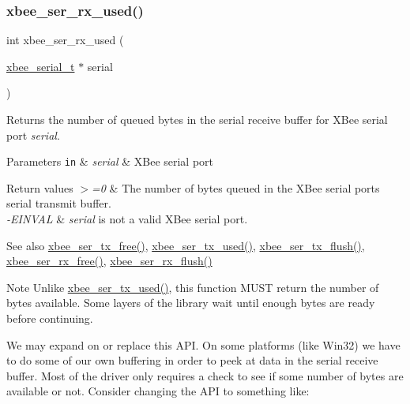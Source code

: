\subsubsection{\texorpdfstring{xbee\+\_\+ser\+\_\+rx\+\_\+used()}{xbee\_ser\_rx\_used()}}
{\footnotesize\ttfamily int xbee\+\_\+ser\+\_\+rx\+\_\+used (\begin{DoxyParamCaption}\item[{\hyperlink{structxbee__serial__t}{xbee\+\_\+serial\+\_\+t} $\ast$}]{serial }\end{DoxyParamCaption})}



Returns the number of queued bytes in the serial receive buffer for X\+Bee serial port {\itshape serial}. 


\begin{DoxyParams}[1]{Parameters}
\mbox{\tt in}  & {\em serial} & X\+Bee serial port\\
\hline
\end{DoxyParams}

\begin{DoxyRetVals}{Return values}
{\em $>$=0} & The number of bytes queued in the X\+Bee serial port\textquotesingle{}s serial transmit buffer. \\
\hline
{\em -\/\+E\+I\+N\+V\+AL} & {\itshape serial} is not a valid X\+Bee serial port.\\
\hline
\end{DoxyRetVals}
\begin{DoxySeeAlso}{See also}
\hyperlink{group__xbee__serial_ga3ad8f378b572d6fec982f1086bd3b94f}{xbee\+\_\+ser\+\_\+tx\+\_\+free()}, \hyperlink{group__xbee__serial_gaabf70934d186354cde4ac14ed27d1bd2}{xbee\+\_\+ser\+\_\+tx\+\_\+used()}, \hyperlink{group__xbee__serial_ga05308d37301d27715f1e1308b7189220}{xbee\+\_\+ser\+\_\+tx\+\_\+flush()}, \hyperlink{group__xbee__serial_ga16fb431a1e66861439518e562431821f}{xbee\+\_\+ser\+\_\+rx\+\_\+free()}, \hyperlink{group__xbee__serial_ga98a6d5ceb5e1445e8ef82ccaa65a8c15}{xbee\+\_\+ser\+\_\+rx\+\_\+flush()}
\end{DoxySeeAlso}
\begin{DoxyNote}{Note}
Unlike \hyperlink{group__xbee__serial_gaabf70934d186354cde4ac14ed27d1bd2}{xbee\+\_\+ser\+\_\+tx\+\_\+used()}, this function M\+U\+ST return the number of bytes available. Some layers of the library wait until enough bytes are ready before continuing.
\end{DoxyNote}
We may expand on or replace this A\+PI. On some platforms (like Win32) we have to do some of our own buffering in order to peek at data in the serial receive buffer. Most of the driver only requires a check to see if some number of bytes are available or not. Consider changing the A\+PI to something like\+:


